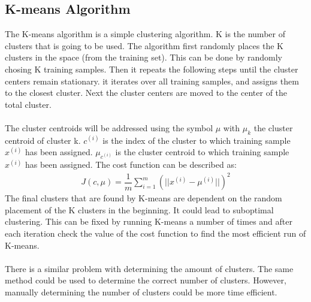 \subsection{K-means Algorithm}
The K-means algorithm is a simple clustering algorithm. K is the number of clusters that is going to be used. The algorithm first randomly places the K clusters in the space (from the training set). This can be done by randomly chosing K training samples. Then it repeats the following steps until the cluster centers remain stationary. it iterates over all training samples, and assigns them to the closest cluster. Next the cluster centers are moved to the center of the total cluster. \\\\
The cluster centroids will be addressed using the symbol $\mu$ with $\mu_k$ the cluster centroid of cluster k. $c^{(i)}$ is the index of the cluster to which training sample  $x^{(i)}$ has been assigned. $\mu_{c^{(i)}}$ is the cluster centroid to which training sample $x^{(i)}$ has been assigned. The cost function can be described as:
\begin{align}
J(c, \mu) = \dfrac{1}{m} \sum\limits_{i=1}^m(|| x^{(i)} - \mu^{(i)}||)^2
\end{align}
The final clusters that are found by K-means are dependent on the random placement of the K clusters in the beginning. It could lead to suboptimal clustering. This can be fixed by running K-means a number of times and after each iteration check the value of the cost function to find the most efficient run of K-means. \\\\
There is a similar problem with determining the amount of clusters. The same method could be used to determine the correct number of clusters. However, manually determining the number of clusters could be more time efficient.
